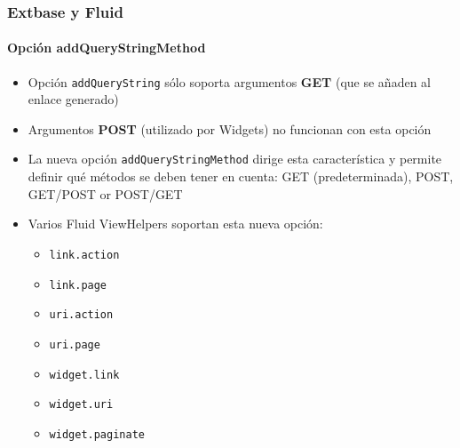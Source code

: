 \begin{frame}[fragile]
	\frametitle{Extbase y Fluid}
	\framesubtitle{Opción addQueryStringMethod}

	\begin{itemize}
		\item Opción \texttt{addQueryString} sólo soporta argumentos \textbf{GET}\newline
			\small(que se añaden al enlace generado)\normalsize
		\item Argumentos \textbf{POST} (utilizado por Widgets) no funcionan con esta opción
		\item La nueva opción \texttt{addQueryStringMethod} dirige esta característica y permite definir qué métodos se deben tener en cuenta:\newline
			GET (predeterminada), POST, GET/POST or POST/GET
		\item Varios Fluid ViewHelpers soportan esta nueva opción:

			\begin{itemize}\smaller
				\item \texttt{link.action}
				\item \texttt{link.page}
				\item \texttt{uri.action}
				\item \texttt{uri.page}
				\item \texttt{widget.link}
				\item \texttt{widget.uri}
				\item \texttt{widget.paginate}
			\end{itemize}

	\end{itemize}

\end{frame}


